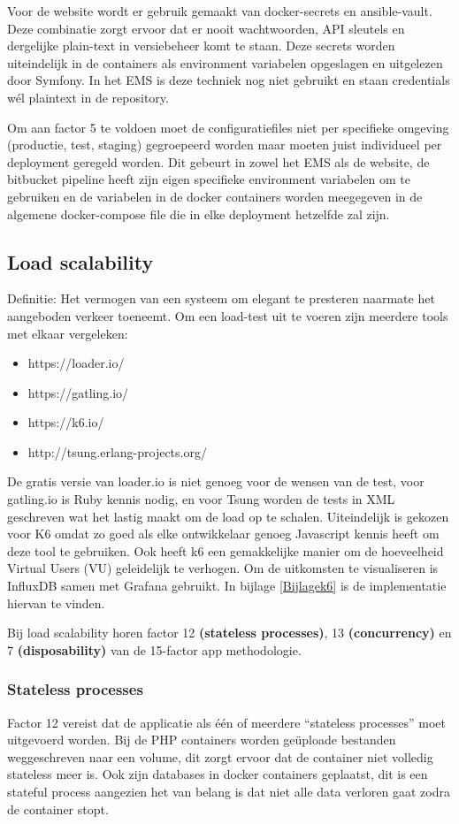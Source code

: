 Voor de website wordt er gebruik gemaakt van docker-secrets en ansible-vault. Deze combinatie zorgt ervoor dat er nooit wachtwoorden, API sleutels en dergelijke plain-text in versiebeheer komt te staan. Deze secrets worden uiteindelijk in de containers als environment variabelen opgeslagen en uitgelezen door Symfony. In het EMS is deze techniek nog niet gebruikt en staan credentials wél plaintext in de repository.

Om aan factor 5 te voldoen moet de configuratiefiles niet per specifieke omgeving (productie, test, staging) gegroepeerd worden maar moeten juist individueel per deployment geregeld worden. Dit gebeurt in zowel het EMS als de website, de bitbucket pipeline heeft zijn eigen specifieke environment variabelen om te gebruiken en de variabelen in de docker containers worden meegegeven in de algemene docker-compose file die in elke deployment hetzelfde zal zijn.

\subsection{Load scalability}
Definitie: Het vermogen van een systeem om elegant te presteren naarmate het aangeboden verkeer toeneemt. Om een load-test uit te voeren zijn meerdere tools met elkaar vergeleken:
\begin{itemize}
	\item https://loader.io/
	\item https://gatling.io/
	\item https://k6.io/
	\item http://tsung.erlang-projects.org/
\end{itemize}

De gratis versie van loader.io is niet genoeg voor de wensen van de test, voor gatling.io is Ruby kennis nodig, en voor Tsung worden de tests in XML geschreven wat het lastig maakt om de load op te schalen. Uiteindelijk is gekozen voor K6 omdat zo goed als elke ontwikkelaar genoeg Javascript kennis heeft om deze tool te gebruiken. Ook heeft k6 een gemakkelijke manier om de hoeveelheid Virtual Users (VU) geleidelijk te verhogen. Om de uitkomsten te visualiseren is InfluxDB samen met Grafana gebruikt. In bijlage \ref{Bijlagek6} is de implementatie hiervan te vinden.

Bij load scalability horen factor 12 \textbf{(stateless processes)}, 13 \textbf{(concurrency)} en 7 \textbf{(disposability)} van de 15-factor app methodologie. 

\subsubsection{Stateless processes}
Factor 12 vereist dat de applicatie als één of meerdere \enquote{stateless processes} moet uitgevoerd worden. Bij de PHP containers worden geüploade bestanden weggeschreven naar een volume, dit zorgt ervoor dat de container niet volledig stateless meer is. Ook zijn databases in docker containers geplaatst, dit is een stateful process aangezien het van belang is dat niet alle data verloren gaat zodra de container stopt.

